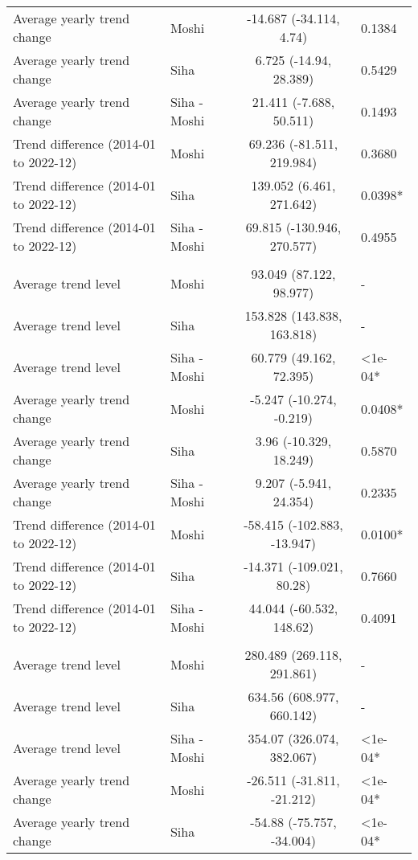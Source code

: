 \begin{longtable}{l|lcl}
Average yearly trend change & Moshi & -14.687 (-34.114, 4.74) & 0.1384 \\ 
Average yearly trend change & Siha & 6.725 (-14.94, 28.389) & 0.5429 \\ 
Average yearly trend change & Siha - Moshi & 21.411 (-7.688, 50.511) & 0.1493 \\ 
Trend difference (2014-01 to 2022-12) & Moshi & 69.236 (-81.511, 219.984) & 0.3680 \\ 
Trend difference (2014-01 to 2022-12) & Siha & 139.052 (6.461, 271.642) & 0.0398* \\ 
Trend difference (2014-01 to 2022-12) & Siha - Moshi & 69.815 (-130.946, 270.577) & 0.4955 \\ 
\midrule\addlinespace[2.5pt]
\multicolumn{4}{l}{Infectious Eye Disease} \\ 
\midrule\addlinespace[2.5pt]
Average trend level & Moshi & 93.049 (87.122, 98.977) & - \\ 
Average trend level & Siha & 153.828 (143.838, 163.818) & - \\ 
Average trend level & Siha - Moshi & 60.779 (49.162, 72.395) & <1e-04* \\ 
Average yearly trend change & Moshi & -5.247 (-10.274, -0.219) & 0.0408* \\ 
Average yearly trend change & Siha & 3.96 (-10.329, 18.249) & 0.5870 \\ 
Average yearly trend change & Siha - Moshi & 9.207 (-5.941, 24.354) & 0.2335 \\ 
Trend difference (2014-01 to 2022-12) & Moshi & -58.415 (-102.883, -13.947) & 0.0100* \\ 
Trend difference (2014-01 to 2022-12) & Siha & -14.371 (-109.021, 80.28) & 0.7660 \\ 
Trend difference (2014-01 to 2022-12) & Siha - Moshi & 44.044 (-60.532, 148.62) & 0.4091 \\ 
\midrule\addlinespace[2.5pt]
\multicolumn{4}{l}{Intestinal Worms} \\ 
\midrule\addlinespace[2.5pt]
Average trend level & Moshi & 280.489 (269.118, 291.861) & - \\ 
Average trend level & Siha & 634.56 (608.977, 660.142) & - \\ 
Average trend level & Siha - Moshi & 354.07 (326.074, 382.067) & <1e-04* \\ 
Average yearly trend change & Moshi & -26.511 (-31.811, -21.212) & <1e-04* \\ 
Average yearly trend change & Siha & -54.88 (-75.757, -34.004) & <1e-04* \\ 

\end{longtable}
